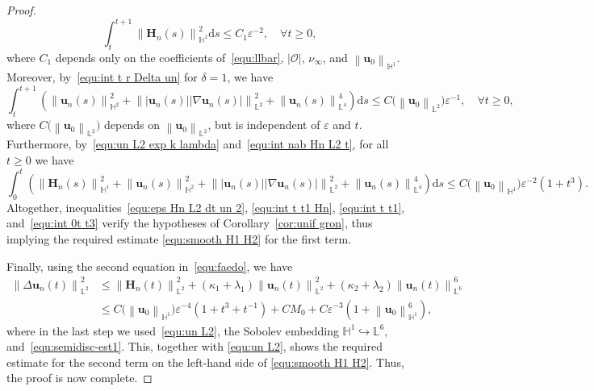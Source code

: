 \documentclass[11pt, reqno]{amsart}
\theoremstyle{definition}
\numberwithin{equation}{section}
\newcommand{\bff}{\boldsymbol}
\newcommand{\bb}{\mathbb}
\newcommand{\ds}{\mathrm{d}s}
\newcommand{\norm}[2]{\left\|{#1}\right\|_{#2}}
\begin{document}
\begin{proof}
\begin{equation}
    \int_t^{t+1} \norm{\bff{H}_n(s)}{\bb{H}^1}^2 \ds
    \leq
    C_1 \varepsilon^{-2}, \quad \forall t\geq 0,
\end{equation}
where $C_1$ depends only on the coefficients of~\eqref{equ:llbar}, $|\mathscr{O}|$, $\nu_\infty$, and $\norm{\bff{u}_0}{\bb{H}^1}$. Moreover, by~\eqref{equ:int t r Delta un} for $\delta=1$, we have
\begin{equation}\label{equ:int t t1}
    \int_t^{t+1} \left( \norm{\bff{u}_n(s)}{\bb{H}^2}^2 +  \norm{|\bff{u}_n(s)| |\nabla \bff{u}_n(s)|}{\bb{L}^2}^2 + \norm{\bff{u}_n(s)}{\bb{L}^4}^4  \right) \ds 
    \leq
    C\big(\norm{\bff{u}_0}{\bb{L}^2}\big) \varepsilon^{-1}, \quad \forall t\geq 0,
\end{equation}
where $C\big(\norm{\bff{u}_0}{\bb{L}^2}\big)$ depends on $\norm{\bff{u}_0}{\bb{L}^2}$, but is independent of $\varepsilon$ and $t$. Furthermore, by~\eqref{equ:un L2 exp k lambda} and~\eqref{equ:int nab Hn L2 t}, for all $t\geq 0$ we have
\begin{equation}\label{equ:int 0t t3}
    \int_0^t \left( \norm{\bff{H}_n(s)}{\bb{H}^1}^2 + \norm{\bff{u}_n(s)}{\bb{H}^2}^2 +  \norm{|\bff{u}_n(s)| |\nabla \bff{u}_n(s)|}{\bb{L}^2}^2 + \norm{\bff{u}_n(s)}{\bb{L}^4}^4 \right) \ds 
    \leq 
    C\big(\norm{\bff{u}_0}{\bb{H}^1}\big) \varepsilon^{-2}   \left(1+t^3\right).
\end{equation}
Altogether, inequalities~\eqref{equ:eps Hn L2 dt un 2}, \eqref{equ:int t t1 Hn}, \eqref{equ:int t t1}, and~\eqref{equ:int 0t t3} verify the hypotheses of Corollary~\ref{cor:unif gron}, thus implying the required estimate \eqref{equ:smooth H1 H2} for the first term.

 
Finally, using the second equation in~\eqref{equ:faedo}, we have
\begin{align*}
    \norm{\Delta \bff{u}_n(t)}{\bb{L}^2}^2
    &\leq
    \norm{\bff{H}_n(t)}{\bb{L}^2}^2
    +
    (\kappa_1+\lambda_1) \norm{\bff{u}_n(t)}{\bb{L}^2}^2
    +
    (\kappa_2+\lambda_2) \norm{\bff{u}_n(t)}{\bb{L}^6}^6
    \\
    &\leq
    C\big(\norm{\bff{u}_0}{\bb{H}^1}\big) \varepsilon^{-4} (1+t^3+t^{-1})
    +
    CM_0
    +
    C \varepsilon^{-3} \left(1+\norm{\bff{u}_0}{\bb{H}^1}^6\right),
\end{align*}
where in the last step we used~\eqref{equ:un L2}, the Sobolev embedding $\bb{H}^1 \hookrightarrow \bb{L}^6$, and~\eqref{equ:semidisc-est1}. This, together with \eqref{equ:un L2}, shows the required estimate for the second term on the left-hand side of \eqref{equ:smooth H1 H2}. Thus, the proof is now complete.
\end{proof}
\end{document}
